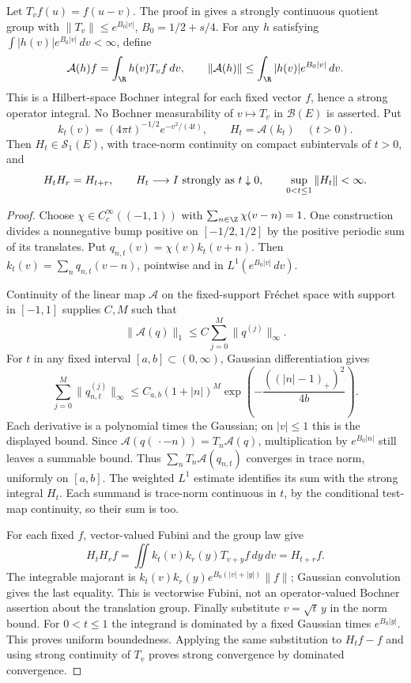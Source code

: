 Let $T_vf(u)=f(u-v)$. The proof in  gives a strongly continuous quotient group with
$\|T_v\|\le e^{B_0|v|}$, $B_0=1/2+s/4$. For any $h$ satisfying
$\int|h(v)|e^{B_0|v|}\,dv<\infty$, define
\[
 \mathcal A(h)f=\int_\R h(v)T_vf\,dv,\qquad
 \|\mathcal A(h)\|\le\int_\R|h(v)|e^{B_0|v|}\,dv.
\]
This is a Hilbert-space Bochner integral for each fixed vector $f$, hence a strong operator integral. No Bochner measurability of $v\mapsto T_v$ in $\mathcal B(E)$ is asserted.
Put
\[
 k_t(v)=(4\pi t)^{-1/2}e^{-v^2/(4t)},\qquad H_t=\mathcal A(k_t)\quad(t>0).
\]
Then $H_t\in\mathcal S_1(E)$, with trace-norm continuity on compact subintervals of $t>0$, and
\[
 H_tH_r=H_{t+r},\qquad H_t\longrightarrow I\ \hbox{strongly as }t\downarrow0,
 \qquad \sup_{0<t\le1}\|H_t\|<\infty.
\]
\begin{proof}
Choose $\chi\in C_c^\infty((-1,1))$ with
$\sum_{n\in\Z}\chi(v-n)=1$. One construction divides a nonnegative bump positive on $[-1/2,1/2]$ by the positive periodic sum of its translates. Put
$q_{n,t}(v)=\chi(v)k_t(v+n)$. Then
$k_t(v)=\sum_n q_{n,t}(v-n)$, pointwise and in $L^1(e^{B_0|v|}\,dv)$.

Continuity of the linear map $\mathcal A$ on the fixed-support Fr\'echet space with support in $[-1,1]$ supplies $C,M$ such that
\[
 \|\mathcal A(q)\|_1\le C\sum_{j=0}^{M}\|q^{(j)}\|_\infty.
\]
For $t$ in any fixed interval $[a,b]\subset(0,\infty)$, Gaussian differentiation gives
\[
 \sum_{j=0}^{M}\|q_{n,t}^{(j)}\|_\infty
 \le C_{a,b}(1+|n|)^M
       \exp\!\left(-\frac{((|n|-1)_+)^2}{4b}\right).
\]
Each derivative is a polynomial times the Gaussian; on $|v|\le1$ this is the displayed bound. Since
$\mathcal A(q(\,\cdot-n))=T_n\mathcal A(q)$, multiplication by $e^{B_0|n|}$ still leaves a summable bound. Thus
$\sum_nT_n\mathcal A(q_{n,t})$ converges in trace norm, uniformly on $[a,b]$. The weighted $L^1$ estimate identifies its sum with the strong integral $H_t$. Each summand is trace-norm continuous in $t$, by the conditional test-map continuity, so their sum is too.

For each fixed $f$, vector-valued Fubini and the group law give
\[
 H_tH_rf=\iint k_t(v)k_r(y)T_{v+y}f\,dy\,dv=H_{t+r}f.
\]
The integrable majorant is
$k_t(v)k_r(y)e^{B_0(|v|+|y|)}\|f\|$; Gaussian convolution gives the last equality. This is vectorwise Fubini, not an operator-valued Bochner assertion about the translation group.
Finally substitute $v=\sqrt t\,y$ in the norm bound. For $0<t\le1$ the integrand is dominated by a fixed Gaussian times $e^{B_0|y|}$. This proves uniform boundedness. Applying the same substitution to
$H_tf-f$ and using strong continuity of $T_v$ proves strong convergence by dominated convergence.
\end{proof}

